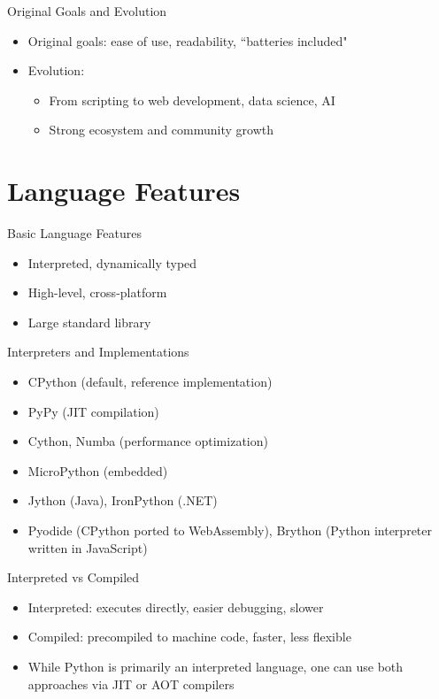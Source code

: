 \documentclass[12pt, aspectratio=169]{beamer}
\begin{document}
    \begin{frame}{Original Goals and Evolution}
        \begin{itemize}
            \item Original goals: ease of use, readability, ``batteries included"
            \item Evolution:
            \begin{itemize}
                \item From scripting to web development, data science, AI
                \item Strong ecosystem and community growth
            \end{itemize}
        \end{itemize}
    \end{frame}


    \section{Language Features}

        \begin{frame}{Basic Language Features}
        \begin{itemize}
            \item Interpreted, dynamically typed
            \item High-level, cross-platform
            \item Large standard library
        \end{itemize}
    \end{frame}


    \begin{frame}{Interpreters and Implementations}
        \begin{itemize}
            \item CPython (default, reference implementation)
            \item PyPy (JIT compilation)
            \item Cython, Numba (performance optimization)
            \item MicroPython (embedded)
            \item Jython (Java), IronPython (.NET)
            \item Pyodide (CPython ported to WebAssembly), Brython (Python interpreter written in JavaScript)
        \end{itemize}
    \end{frame}


    \begin{frame}{Interpreted vs Compiled}
        \begin{itemize}
            \item Interpreted: executes directly, easier debugging, slower
            \item Compiled: precompiled to machine code, faster, less flexible
            \item While Python is primarily an interpreted language, one can use both approaches via JIT or AOT compilers
        \end{itemize}
    \end{frame}
\end{document}

